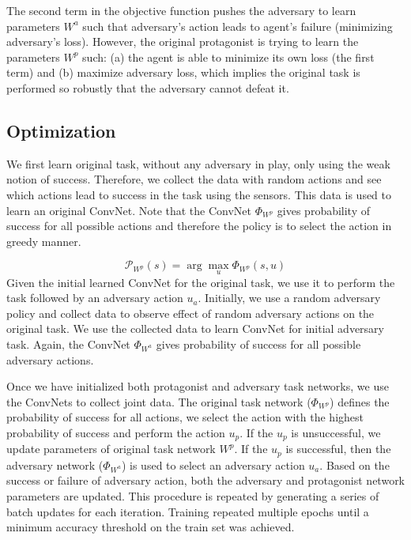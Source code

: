 \documentclass[letterpaper, 10 pt, conference]{ieeeconf}  %
\begin{document}

The second term in the objective function pushes the adversary to learn parameters $W^a$ such that adversary's action leads to agent's failure (minimizing adversary's loss). However, the original protagonist is trying to learn the parameters $W^p$ such: (a) the agent is able to minimize its own loss (the first term) and (b) maximize adversary loss, which implies the original task is performed so robustly that the adversary cannot defeat it.

\subsection{Optimization} We first learn original task, without any adversary in play, only using the weak notion of success. Therefore, we collect the data with random actions and see which actions lead to success in the task using the sensors. This data is used to learn an original ConvNet. Note that the ConvNet $\Phi_{W^p}$ gives probability of success for all possible actions and therefore the policy is to select the action in greedy manner.

\begin{equation}
    \mathcal{P}_{W^p}(s) = \arg\max_{u}{\Phi_{W^p}(s,u)}
\end{equation} Given the initial learned ConvNet for the original task, we use it to perform the task followed by an adversary action $u_a$. Initially, we use a random adversary policy and collect data to observe effect of random adversary actions on the original task. We use the collected data to learn ConvNet for initial adversary task. Again, the ConvNet $\Phi_{W^a}$ gives probability of success for all possible adversary actions.

 Once we have initialized both protagonist and adversary task networks, we use the ConvNets to collect joint data. The original task network ($\Phi_{W^p}$) defines the probability of success for all actions, we select the action with the highest probability of success and perform the action $u_p$. If the $u_p$ is unsuccessful, we update parameters of original task network $W^p$. If the $u_p$ is successful, then the adversary network ($\Phi_{W^a}$) is used to select an adversary action $u_a$. Based on the success or failure of adversary action, both the adversary and protagonist network parameters are updated. This procedure is repeated by generating a series of batch updates for each iteration.  Training repeated multiple epochs until a minimum accuracy threshold on the train set was achieved.
\end{document}
